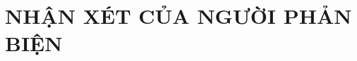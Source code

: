 \documentclass[11pt]{report}
\begin{document}
	\chapter*{NHẬN XÉT CỦA NGƯỜI PHẢN BIỆN}
	\dotfill\\\dotfill\\\dotfill\\\dotfill\\\dotfill
	\\\dotfill\\\dotfill\\\dotfill\\\dotfill\\\dotfill
	\\\dotfill\\\dotfill\\\dotfill\\\dotfill\\\dotfill
	\\\dotfill\\\dotfill\\\dotfill\\\dotfill\\\dotfill
	\\\dotfill\\\dotfill\\\dotfill\\\dotfill\\\dotfill
	\\\dotfill\\\dotfill\\\dotfill\\\dotfill\\\dotfill
	\\\dotfill\\\dotfill\\\dotfill\\
	\pagebreak

	
	
	
	\setcounter{page}{1}

	
	


	\fontsize{13px}{13px}\selectfont\justifying
	\renewcommand*\contentsname{MỤC LỤC}
	\cleardoublepage
	\tableofcontents
	
\end{document}

